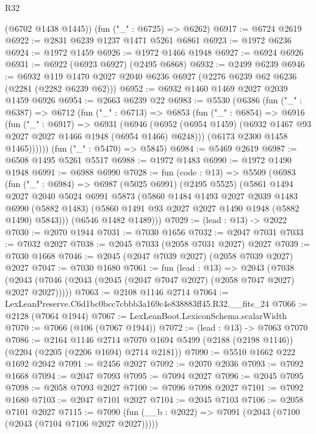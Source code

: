 \begin{lexlean}{R32}
\begin{coremodule}
      (@6702 @1438 @1445))
    (fun ("_" : @6725) => @6262)
@6917 := @6724 @2619
@6922 := @2831 @6239 @1237 @1471 @5261 @6861
@6923 := @1972 @6236
@6924 := @1972 @1459
@6926 := @1972 @1466 @1948
@6927 := @6924 @6926
@6931 := @6922 (@6923 @6927) (@2495 @6868)
@6932 := @2499 @6239
@6946 := @6932 @119 @1470 @2027 @2040 @6236 @6927 (@2276 @6239 @62 @6236 (@2281 (@2282 @6239 @62)))
@6952 := @6932 @1460 @1469 @2027 @2039 @1459 @6926
@6954 := @2663 @6239 @22
@6983 := @5530
    (@6386
      (fun ("_" : @6387) =>
      @6712
        (fun ("_" : @6713) =>
        @6853
          (fun ("_" : @6854) =>
          @6916
            (fun ("_" : @6917) =>
            @6931
              (@6946
                (@6952 (@6954 @1459) (@6932 @1467 @93 @2027 @2027 @1466 @1948 (@6954 @1466) @6248)))
              (@6173 @2300 @1458 @1465))))))
    (fun ("_" : @5470) => @5845)
@6984 := @5469 @2619
@6987 := @6508 @1495 @5261 @5517
@6988 := @1972 @1483
@6990 := @1972 @1490 @1948
@6991 := @6988 @6990
@7028 := fun (code : @13) =>
  @5509
    (@6983
      (fun ("_" : @6984) =>
      @6987
        (@5025 @6991)
        (@2495 @5525)
        (@5861
          @1494
          @2027
          @2040
          @5024
          @6991
          @5873
          (@5860
            @1484
            @1493
            @2027
            @2039
            @1483
            @6990
            (@5882 @1483)
            (@5860 @1491 @93 @2027 @2027 @1490 @1948 (@5882 @1490) @5843)))
        (@6546 @1482 @1489)))
@7029 := (lead : @13) -> @2022
@7030 := @2070 @1944
@7031 := @7030 @1656
@7032 := @2047 @7031
@7033 := @7032 @2027
@7038 := @2045 @7033 (@2058 @7031 @2027) @2027
@7039 := @7030 @1668
@7046 := @2045 (@2047 @7039 @2027) (@2058 @7039 @2027) @2027
@7047 := @7030 @1680
@7061 := fun (lead : @13) =>
  @2043 (@7038 (@2043 (@7046 (@2043 (@2045 (@2047 @7047 @2027) (@2058 @7047 @2027) @2027 @2027)))))
@7063 := @2108 @1146 @2714
@7064 := LexLeanPreserve.C6d1bc0bcc7cbbb3a169c4e838883ff45.R32.__fits_24
@7066 := @2128 (@7064 @1944)
@7067 := LexLeanBoot.LexiconSchema.scalarWidth
@7070 := @7066 (@106 (@7067 @1944))
@7072 := (lead : @13) -> @7063 @7070
@7086 := @2164
    @1146
    @2714
    @7070
    @1694
    @5499
    (@2188 (@2198 @1146))
    (@2204 (@2205 (@2206 @1694) @2714 @2181))
@7090 := @5510 @1662 @222 @1692 @2042
@7091 := @2456 @2027
@7092 := @2070 @2036
@7093 := @7092 @1668
@7094 := @2047 @7093
@7095 := @7094 @2027
@7096 := @2045 @7095
@7098 := @2058 @7093 @2027
@7100 := @7096 @7098 @2027
@7101 := @7092 @1680
@7103 := @2047 @7101 @2027
@7104 := @2045 @7103
@7106 := @2058 @7101 @2027
@7115 := @7090 (fun (__b : @2022) => @7091 (@2043 (@7100 (@2043 (@7104 @7106 @2027 @2027)))))

\end{coremodule}
\end{lexlean}
